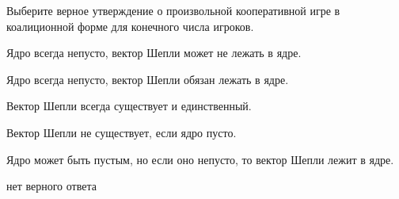 
\begin{question}
Выберите верное утверждение о произвольной кооперативной игре в
коалиционной форме для конечного числа игроков.
\begin{answerlist}
  \item Ядро всегда непусто, вектор Шепли может не лежать в ядре.
  \item Ядро всегда непусто, вектор Шепли обязан лежать в ядре.
  \item Вектор Шепли всегда существует и единственный.
  \item Вектор Шепли не существует, если ядро пусто.
  \item Ядро может быть пустым, но если оно непусто, то вектор Шепли лежит в
ядре.
  \item нет верного ответа
\end{answerlist}
\end{question}



